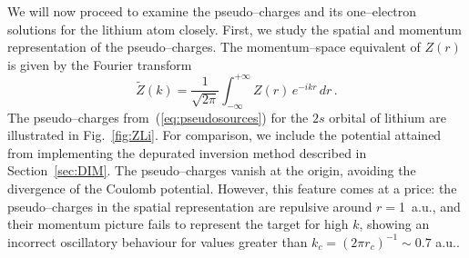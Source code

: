 \documentclass[10pt]{article}
\begin{document}
We will now proceed to examine the pseudo--charges and its 
one--electron solutions for the lithium atom closely. First, we study 
the spatial and momentum representation of the pseudo--charges. The 
momentum--space equivalent of $Z(r)$ is given by the Fourier 
transform
\begin{equation}
 \widetilde{Z}(k) = \frac{1}{\sqrt{2\pi}} \int_{-\infty}^{+\infty} 
 Z(r)\,e^{-ikr}\,dr\,.
\end{equation}
The pseudo--charges from~(\ref{eq:pseudosources}) for the $2s$ 
orbital of lithium are illustrated in Fig.~\ref{fig:ZLi}. For 
comparison, we include the potential attained from implementing the 
depurated inversion method described in Section~\ref{sec:DIM}. The 
pseudo--charges vanish at the origin, avoiding the divergence of the 
Coulomb potential. However, this feature comes at a price: the 
pseudo--charges in the spatial representation are repulsive around 
\mbox{$r= $1 a.u.}, and their momentum picture fails to represent the 
target for high $k$, showing an incorrect oscillatory behaviour for 
values greater than $k_c=(2\pi r_c)^{-1}\sim0.7$ a.u..
\end{document}
